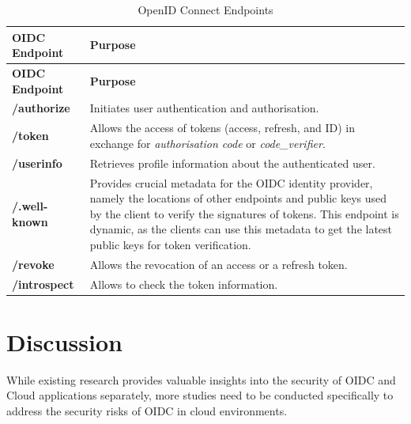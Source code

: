     
    
    \begin{longtable}{|>{\raggedright\arraybackslash}p{4cm}|>{\raggedright\arraybackslash}p{11cm}|}
    \caption{OpenID Connect Endpoints}
    \label{table:outh_endpoints}
    \hline
    \rowcolor{grey!15}
    \textbf{OIDC Endpoint} & \textbf{Purpose} \\ \hline
    \endfirsthead
    \hline
    \rowcolor{grey!15}
    \textbf{OIDC Endpoint} & \textbf{Purpose} \\ \hline
    \endhead
    \hline 
    \endfoot
    \hline
    \endlastfoot
   \textbf{/authorize} & Initiates user authentication and authorisation. \\ \hline

    \textbf{/token} & Allows the access of tokens (access, refresh, and ID) in exchange for \textit{authorisation code} or \textit{code\_verifier}.\\ \hline
    
    \textbf{/userinfo} & Retrieves profile information about the authenticated user. \\ \hline
    
    \textbf{/.well-known} & Provides crucial metadata for the OIDC identity provider, namely the locations of other endpoints and public keys used by the client to verify the signatures of tokens. This endpoint is dynamic, as the clients can use this metadata to get the latest public keys for token verification. \\ \hline
    
    \textbf{/revoke} & Allows the revocation of an access or a refresh token. \\ \hline

    \textbf{/introspect} & Allows to check the token information. \\ \hline
        
    \end{longtable}
    





\section{Discussion}

While existing research provides valuable insights into the security of OIDC and Cloud applications separately, more studies need to be conducted specifically to address the security risks of OIDC in cloud environments. 

